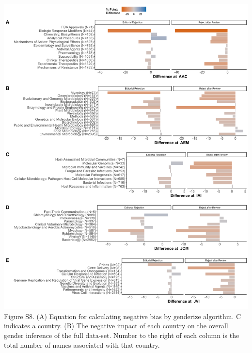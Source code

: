 \documentclass[11pt,]{article}
\begin{document}
\includegraphics{Figure_S8.png} Figure S8. (A) Equation for calculating
negative bias by genderize algorithm. C indicates a country. (B) The
negative impact of each country on the overall gender inference of the
full data-set. Number to the right of each column is the total number of
names associated with that country.
\end{document}
